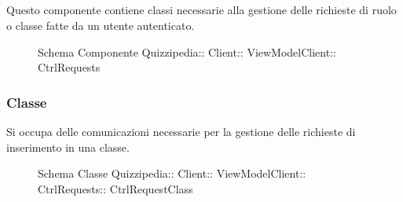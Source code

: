 \subsection{}
Questo componente contiene classi necessarie alla gestione delle richieste di ruolo o classe fatte da un utente autenticato.
\begin{figure}[H]
\centering
\noindent{}
\caption[Schema Componente CtrlRequests]{Schema Componente Quizzipedia:: Client:: ViewModelClient:: CtrlRequests}
\end{figure}
\subsubsection{Classe }
Si occupa delle comunicazioni necessarie per la gestione delle richieste di inserimento in una classe.
\begin{figure}[H]
\centering
\noindent{}
\caption[Schema Classe CtrlRequestClass]{Schema Classe Quizzipedia:: Client:: ViewModelClient:: CtrlRequests:: CtrlRequestClass}
\end{figure}
\begin{itemize}
\end{itemize}

